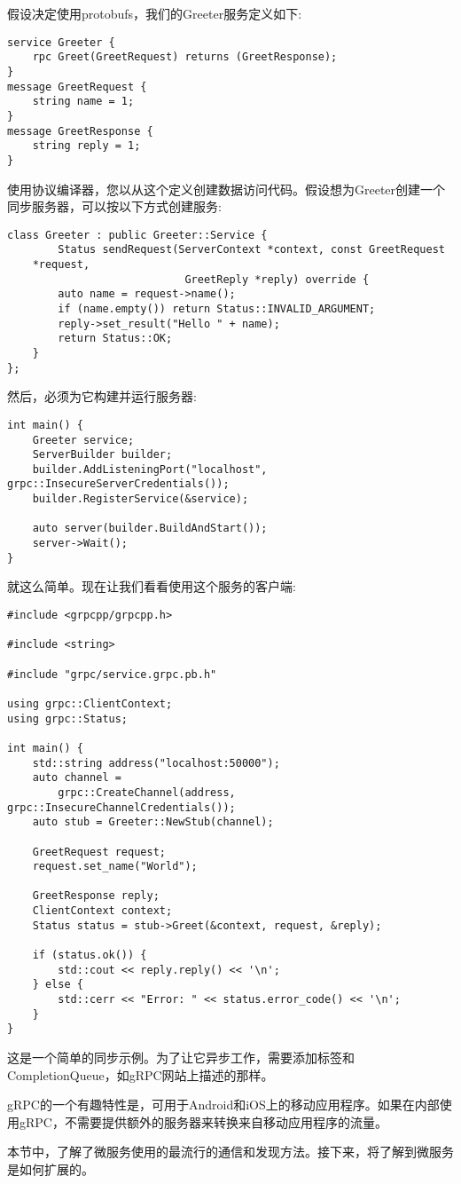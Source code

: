 假设决定使用protobufs，我们的Greeter服务定义如下:

\begin{lstlisting}[style=styleCXX]
service Greeter {
	rpc Greet(GreetRequest) returns (GreetResponse);
}
message GreetRequest {
	string name = 1;
}
message GreetResponse {
	string reply = 1;
}
\end{lstlisting}

使用协议编译器，您以从这个定义创建数据访问代码。假设想为Greeter创建一个同步服务器，可以按以下方式创建服务:

\begin{lstlisting}[style=styleCXX]
class Greeter : public Greeter::Service {
		Status sendRequest(ServerContext *context, const GreetRequest
	*request,
							GreetReply *reply) override {
		auto name = request->name();
		if (name.empty()) return Status::INVALID_ARGUMENT;
		reply->set_result("Hello " + name);
		return Status::OK;
	}
};
\end{lstlisting}

然后，必须为它构建并运行服务器:

\begin{lstlisting}[style=styleCXX]
int main() {
	Greeter service;
	ServerBuilder builder;
	builder.AddListeningPort("localhost", grpc::InsecureServerCredentials());
	builder.RegisterService(&service);
	
	auto server(builder.BuildAndStart());
	server->Wait();
}
\end{lstlisting}

就这么简单。现在让我们看看使用这个服务的客户端:

\begin{lstlisting}[style=styleCXX]
#include <grpcpp/grpcpp.h>

#include <string>

#include "grpc/service.grpc.pb.h"

using grpc::ClientContext;
using grpc::Status;

int main() {
	std::string address("localhost:50000");
	auto channel =
		grpc::CreateChannel(address, grpc::InsecureChannelCredentials());
	auto stub = Greeter::NewStub(channel);
	
	GreetRequest request;
	request.set_name("World");
	
	GreetResponse reply;
	ClientContext context;
	Status status = stub->Greet(&context, request, &reply);
	
	if (status.ok()) {
		std::cout << reply.reply() << '\n';
	} else {
		std::cerr << "Error: " << status.error_code() << '\n';
	}
}
\end{lstlisting}

这是一个简单的同步示例。为了让它异步工作，需要添加标签和CompletionQueue，如gRPC网站上描述的那样。

gRPC的一个有趣特性是，可用于Android和iOS上的移动应用程序。如果在内部使用gRPC，不需要提供额外的服务器来转换来自移动应用程序的流量。

本节中，了解了微服务使用的最流行的通信和发现方法。接下来，将了解到微服务是如何扩展的。




